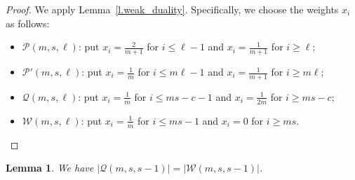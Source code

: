 \documentclass[12pt,a4paper]{article}
\newtheorem{lemma}{Lemma}
\begin{document}
\begin{proof}
    We apply Lemma~\ref{l.weak_duality}. Specifically, we choose the weights $x_i$ as follows:
    \begin{itemize}
        \item[] $\mathcal{P}(m, s, \ell)$: put $x_i = \frac{2}{m+1}$ for $i \leq \ell - 1$ and $x_i = \frac{1}{m+1}$ for $i \geq \ell$;
        \item[] $\mathcal{P}'(m, s, \ell)$: put $x_i = \frac{1}{m}$ for $i \leq m\ell-1$ and $x_i = \frac{1}{m+1}$ for $i \geq m\ell$;
        \item[] $\mathcal{Q}(m, s, \ell)$: put $x_i = \frac{1}{m}$ for $i \leq ms - c - 1$ and $x_i = \frac{1}{2m}$ for $i \geq ms-c$;
        \item[] $\mathcal{W}(m, s, \ell)$: put $x_i = \frac{1}{m}$ for $i \leq ms - 1$ and $x_i = 0$ for $i \geq ms$.
    \end{itemize}
\end{proof}
    \begin{lemma} \label{l.c=1 equality}
     We have   $|\mathcal{Q}(m, s, s-1)| = |\mathcal{W}(m, s, s-1)|$.
    \end{lemma}
\end{document}
